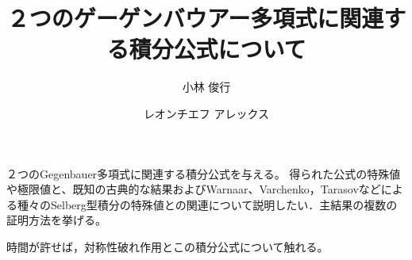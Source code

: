 \documentclass[12pt,a4paper,dvipdfmx]{article}
\title{２つのゲーゲンバウアー多項式に関連する積分公式について}
\author{小林 俊行}{東京大学 大学院数理科学研究科、カブリ数物連携宇宙研究機構}{Toshiyuki Kobayashi}{
Graduate School of Mathematical Sciences, the University of Tokyo,\\
Kavli Institute for the Physics and Mathematics of the Universe}
\author{レオンチエフ アレックス}{東京大学 大学院数理科学研究科}{Alex Leontiev}{Graduate School of Mathematical Sciences,
The University of Tokyo}
\theoremstyle{jplain}
\begin{document}
\maketitle
２つのGegenbauer多項式に関連する積分公式を与える。
得られた公式の特殊値や極限値と、既知の古典的な結果およびWarnaar、Varchenko，Tarasovなどによる種々のSelberg型積分の特殊値との関連について説明したい．主結果の複数の証明方法を挙げる。

時間が許せば，対称性破れ作用とこの積分公式について触れる。
\end{document}
